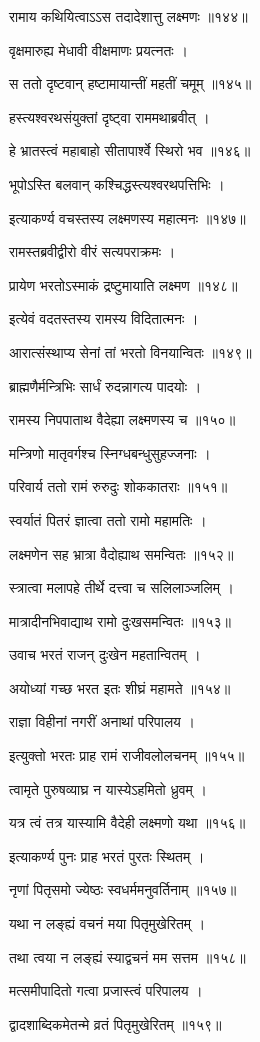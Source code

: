 रामाय कथियित्वाऽऽस तदादेशात्तु लक्ष्मणः ॥१४४॥

वृक्षमारुह्य मेधावी वीक्षमाणः प्रयत्नतः ।

स ततो दृष्टवान् हष्टामायान्तीं महतीं चमूम् ॥१४५॥

हस्त्यश्वरथसंयुक्तां दृष्ट्वा राममथाब्रवीत् ।

हे भ्रातस्त्वं महाबाहो सीतापार्श्वे स्थिरो भव ॥१४६॥

भूपोऽस्ति बलवान् कश्चिद्धस्त्यश्वरथपत्तिभिः ।

इत्याकर्ण्य वचस्तस्य लक्ष्मणस्य महात्मनः ॥१४७॥

रामस्तब्रवीद्वीरो वीरं सत्यपराक्रमः ।

प्रायेण भरतोऽस्माकं द्रष्टुमायाति लक्ष्मण ॥१४८॥

इत्येवं वदतस्तस्य रामस्य विदितात्मनः ।

आरात्संस्थाप्य सेनां तां भरतो विनयान्वितः ॥१४९॥

ब्राह्मणैर्मन्त्रिभिः सार्धं रुदन्नागत्य पादयोः ।

रामस्य निपपाताथ वैदेह्या लक्ष्मणस्य च ॥१५०॥

मन्त्रिणो मातृवर्गश्च स्निग्धबन्धुसुहज्जनाः ।

परिवार्य ततो रामं रुरुदुः शोककातराः ॥१५१॥

स्वर्यातं पितरं ज्ञात्वा ततो रामो महामतिः ।

लक्ष्मणेन सह भ्रात्रा वैदोह्याथ समन्वितः ॥१५२॥

स्त्रात्वा मलापहे तीर्थे दत्त्वा च सलिलाञ्जलिम् ।

मात्रादीनभिवाद्याथ रामो दुःखसमन्वितः ॥१५३॥

उवाच भरतं राजन् दुःखेन महतान्वितम् ।

अयोध्यां गच्छ भरत इतः शीघ्रं महामते ॥१५४॥

राज्ञा विहीनां नगरीं अनाथां परिपालय ।

इत्युक्तो भरतः प्राह रामं राजीवलोलचनम् ॥१५५॥

त्वामृते पुरुषव्याघ्र न यास्येऽहमितो ध्रुवम् ।

यत्र त्वं तत्र यास्यामि वैदेही लक्ष्मणो यथा ॥१५६॥

इत्याकर्ण्य पुनः प्राह भरतं पुरतः स्थितम् ।

नृणां पितृसमो ज्येष्ठः स्वधर्ममनुवर्तिनाम् ॥१५७॥

यथा न लङ्ह्यं वचनं मया पितृमुखेरितम् ।

तथा त्वया न लङ्ह्यं स्याद्वचनं मम सत्तम ॥१५८॥

मत्समीपादितो गत्वा प्रजास्त्वं परिपालय ।

द्वादशाब्दिकमेतन्मे व्रतं पितृमुखेरितम् ॥१५९॥

